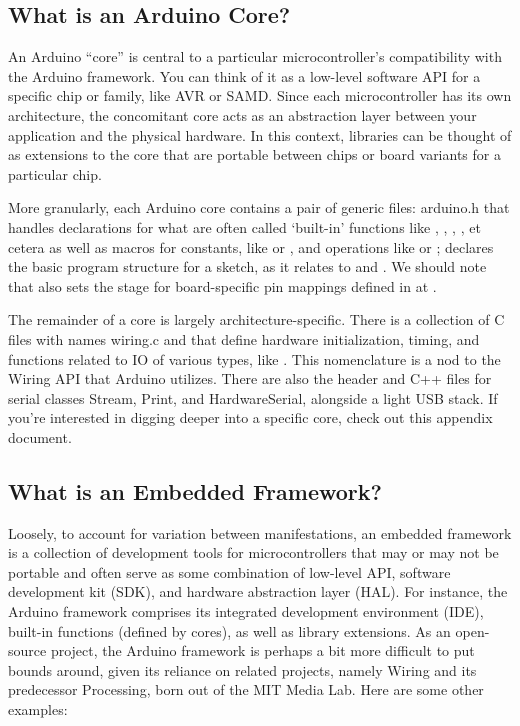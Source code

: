 \subsection{What is an Arduino Core?}

An Arduino “core” is central to a particular microcontroller’s compatibility with the Arduino framework. You can think of it as a low-level software API for a specific chip or family, like AVR or SAMD. Since each microcontroller has its own architecture, the concomitant core acts as an abstraction layer between your application and the physical hardware. In this context, libraries can be thought of as extensions to the core that are portable between chips or board variants for a particular chip.

More granularly, each Arduino core contains a pair of generic files: arduino.h that handles declarations for what are often called ‘built-in’ functions like , , , , et cetera as well as macros for constants, like  or , and operations like  or ;  declares the basic program structure for a sketch, as it relates to  and . We should note that  also sets the stage for board-specific pin mappings defined in  at . 

The remainder of a core is largely architecture-specific. There is a collection of C files with names wiring.c and  that define hardware initialization, timing, and functions related to IO of various types, like . This nomenclature is a nod to the Wiring API that Arduino utilizes. There are also the header and C++ files for serial classes Stream, Print, and HardwareSerial, alongside a light USB stack. If you’re interested in digging deeper into a specific core, check out this appendix document.

\subsection{What is an Embedded Framework?}

Loosely, to account for variation between manifestations, an embedded framework is a collection of development tools for microcontrollers that may or may not be portable and often serve as some combination of low-level API, software development kit (SDK), and hardware abstraction layer (HAL). For instance, the Arduino framework comprises its integrated development environment (IDE), built-in functions (defined by cores), as well as library extensions. As an open-source project, the Arduino framework is perhaps a bit more difficult to put bounds around, given its reliance on related projects, namely Wiring and its predecessor Processing, born out of the MIT Media Lab. Here are some other examples:

